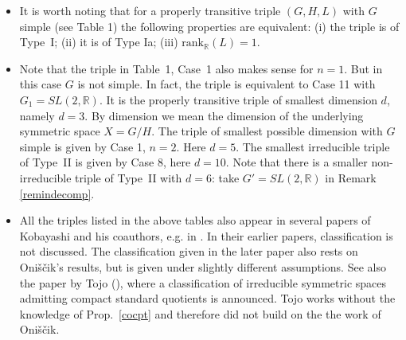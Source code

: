 \documentclass[10]{amsart}
\newtheorem{cor}[thm]{Corollary}
\theoremstyle{remark}
\theoremstyle{definition}
\numberwithin{equation}{section}
\newcommand{\R}{\mathbb{R}}           %
\newcommand{\rank}{\text{rank}}
\newcommand{\fc}{{\mathfrak c}}
\newcommand{\fg}{{\mathfrak g}}
\newcommand{\fh}{{\mathfrak h}}
\newcommand{\fl}{{\mathfrak l}}
\begin{document}
{\begin{itemize}
symmetric (up to compact factors). It follows that Table~1, if we allow to interchange the roles of $H$ and $L$, also gives a classification of all triples $(G,H,L)$ satisfying the assumptions of Prop.~\ref{cocpt}
with $G$ simple up to a natural equivalence relation.
\item It is worth noting that for a properly transitive triple $(G,H,L)$ with $G$ simple (see Table 1) the following properties are equivalent: (i) the triple is of Type~I; (ii) it is of Type Ia; 
(iii) $\rank_{\mathbb {R}} (L)=1$.
\item Note that the triple in Table~1, Case~1 also makes sense for $n=1$. But in this case $G$ is not simple. In fact, the triple is equivalent to Case 11 with $G_1=SL(2,\R)$.
It is the properly transitive triple of smallest dimension $d$, namely  $d=3$. By dimension we mean the dimension of the underlying symmetric space $X=G/H$.
The triple of smallest possible dimension with $G$ simple is given by Case 1, $n=2$. Here $d=5$. The smallest irreducible triple of Type~II is given by Case 8, here $d=10$.
Note that there is a smaller non-irreducible triple of Type~II with $d=6$: take $G'=SL(2,\R)$ in Remark \ref{remindecomp}.
\item All the triples listed in the above tables also appear in several papers of Kobayashi and his coauthors, e.g. in  \cite{KY05}. In their earlier papers, classification is not discussed.
The classification given in the later paper \cite{KK25} also rests on Oni\v s\v cik's results, but is given under slightly different assumptions. See also the paper by Tojo (\cite{To19}), where a classification of irreducible symmetric spaces admitting compact standard quotients is announced. Tojo works without the knowledge of Prop.~\ref{cocpt} and therefore did not build on the the work of  Oni\v s\v cik.
\end{itemize}






}
\end{document}
